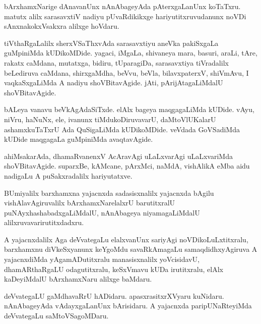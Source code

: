 \documentclass{article}
\begin{document}
\begin{mn}
bArxhamxNarige  dAnavanUnx  nAnAbageyAda  pAterxgaLanUnx  koTaTxru.  matutx alilx  sarasavxtiV  
nadiyu pUvaRdikikxge  hariyutitxruvudanunx noVDi  sAnxnakokxVsakxra  alilxge  hoVdaru.
\end{mn}

\begin{mn}
tiVthaRgaLalilx  sherxVSaThxvAda  sarasavxtiyu  aneVka  pakiSxgaLa  guMpiniMda  kUDikoMDide.  yagaci,  
iMgaLa,  shivaneya mara,  basuri,  araLi, tAre,  rakatx caMdana,  mutatxga,  bidiru,  tUparagiDa,  
sarasavxtiya  tiVradalilx  beLediruva  caMdana,  shirxgaMdha,  beVvu,  beVla, bilavxpaterxV, shiVmAvu,  
I  vaqkaSxgaLiMda  A  nadiyu  shoVBitavAgide.  jAti,  pArijAtagaLiMdalU  shoVBitavAgide.  
\end{mn}

\begin{mn}
bALeya vanavu  beVkAgAdaSiTxde.  elAlx  bageya  maqgagaLiMda  kUDide.  vAyu,  niVru,  
haNuNx,  ele,  ivanunx  tiMdukoDiruvavarU,  daMtoVlUKalarU  ashamxkuTaTxrU  Ada  QuSigaLiMda  
kUDikoMDide.  veVdada  GoVSadiMda  kUDide  maqgagaLa guMpiniMda  avaqtavAgide.                                                          
\end{mn}

\begin{mn}
ahiMsakarAda,  dhamaRvanenxV  AcAravAgi  uLaLxvarAgi  uLaLxvariMda  shoVBitavAgide.  suparxBe,  
kAMcane,  pArxMci,  naMdA,  vishAlikA  eMba  aidu  nadigaLu  A puSakxradalilx  hariyutatxve.
\end{mn}

\begin{mn}
BUmiyalilx  barxhamxna  yajacnxda  sadasisxnalilx  yajacnxda bAgilu  vishAlavAgiruvalilx  bArxhamxNarelalxrU  
barutitxralU  puNAyxhashabadxgaLiMdalU,  nAnAbageya  niyamagaLiMdalU  alilxruvavarirutitxdadxru.
\end{mn}

\begin{mn}
A yajacnxdalilx  Aga  deVvategaLu  elalxvanUnx  sariyAgi noVDikoLuLxtitxralu,  barxhamxnu  
diVkeSxyanunx keYgoMdu savaRkAmagaLu  samaqdidhxyAgiruva A  yajacnxdiMda  yAgamADutitxralu  
manasisxnalilx  yoVcisidavU,  dhamARthaRgaLU  odagutitxralu,  keSxVmavu  kUDa  irutitxralu,  
elAlx kaDeyiMdalU  bArxhamxNaru  alilxge  baMdaru.
\end{mn}

\begin{mn}
deVvategaLU  gaMdhavaRrU  hADidaru.  apasxrasitxrXVyaru  kuNidaru. nAnAbageyAda  
vAdayxgaLanUnx  bArisidaru.  A  yajacnxda  paripUNaRteyiMda  deVvategaLu  saMtoVSagoMDaru.
\end{mn}
\end{document}
